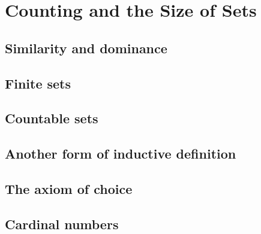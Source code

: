 \chapter{Counting and the Size of Sets}
\section{Similarity and dominance}
\section{Finite sets}
\section{Countable sets}
\section{Another form of inductive definition}
\section{The axiom of choice}
\section{Cardinal numbers}
